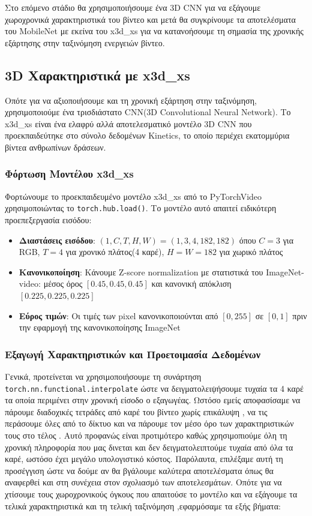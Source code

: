 \documentclass[12pt, a4paper]{article}
\begin{document}
Στο επόμενο στάδιο θα χρησιμοποιήσουμε ένα 3D CNN για να εξάγουμε χωροχρονικά χαρακτηριστικά του βίντεο και μετά θα συγκρίνουμε τα αποτελέσματα του MobileNet με εκείνα του x3d\_xs για να κατανοήσουμε τη σημασία της χρονικής εξάρτησης στην ταξινόμηση ενεργειών βίντεο.

\subsection{3D Χαρακτηριστικά με x3d\_xs}

Οπότε για να αξιοποιήσουμε και τη χρονική εξάρτηση στην ταξινόμηση, χρησιμοποιούμε ένα τρισδιάστατο CNN(3D Convolutional Neural Network). Το x3d\_xs είναι ένα ελαφρύ αλλά αποτελεσματικό μοντέλο 3D CNN που προεκπαιδεύτηκε στο σύνολο δεδομένων Kinetics, το οποίο περιέχει εκατομμύρια βίντεα ανθρωπίνων δράσεων.

\subsubsection{Φόρτωση Μοντέλου x3d\_xs}

Φορτώνουμε το προεκπαιδευμένο μοντέλο x3d\_xs από το PyTorchVideo χρησιμοποιώντας το \texttt{torch.hub.load()}. Το μοντέλο αυτό απαιτεί ειδικότερη προεπεξεργασία εισόδου:
\begin{itemize}
    \item \textbf{Διαστάσεις εισόδου}: $(1,C, T, H, W) = (1, 3, 4, 182, 182)$ όπου $C=3$ για RGB, $T=4$ για χρονικό πλάτος(4 καρέ), $H=W=182$ για χωρικό πλάτος
    \item \textbf{Κανονικοποίηση}: Κάνουμε Z-score normalization με στατιστικά του ImageNet-video: μέσος όρος $[0.45, 0.45, 0.45]$ και κανονική απόκλιση $[0.225, 0.225, 0.225]$
    \item \textbf{Εύρος τιμών}: Οι τιμές των pixel κανονικοποιούνται από $[0, 255]$ σε $[0, 1]$ πριν την εφαρμογή της κανονικοποίησης ImageNet
\end{itemize}

\subsubsection{Εξαγωγή Χαρακτηριστικών και Προετοιμασία Δεδομένων}
Γενικά, προτείνεται να χρησιμοποιήσουμε τη συνάρτηση \texttt{torch.nn.functional.interpolate} ώστε να δειγματολειψήσουμε
τυχαία τα 4 καρέ τα οποία περιμένει στην χρονική είσοδο ο εξαγωγέας. Ωστόσο εμείς αποφασίσαμε να πάρουμε διαδοχικές τετράδες
από καρέ του βίντεο χωρίς επικάλυψη , να τις περάσουμε όλες από το δίκτυο και να πάρουμε τον μέσο όρο των χαρακτηριστικών τους στο τέλος . Αυτό προφανώς είναι προτιμότερο καθώς
χρησιμοπιούμε  όλη τη χρονική πληροφορία που μας δινεται και δεν δειγματολειπτούμε τυχαία από όλα τα καρέ, ωστόσο έχει μεγάλο υπολογιστικό κόστος.
Παρόλαυτα, επιλέξαμε αυτή τη προσέγγιση ώστε να δούμε αν θα βγάλουμε καλύτερα αποτελέσματα όπως θα αναφερθεί και στη συνέχεια στον σχολιασμό των αποτελεσμάτων.
Οπότε για να χτίσουμε τους χωροχρονικούς όγκους που απαιτούσε το μοντέλο και να εξάγουμε τα τελικά χαρακτηριστικά και τη τελική ταξινόμηση ,εφαρμόσαμε τα εξής βήματα:
\end{document}
